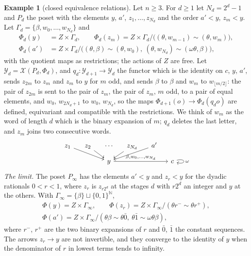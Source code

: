 \documentclass[11pt]{amsart}
\theoremstyle{definition}
\newtheorem{ex}[thm]{Example}
\newcommand{\cX}{\mathcal X}
\begin{document}
\begin{ex}[closed equivalence relations]\label{ex:interval}
Let $n\ge3$. For $d\ge1$ let $N_d=2^d-1$ and $P_d$ the poset with the
elements $y$, $a'$, $z_1,\dots,z_{N_d}$ and the order $a'<y$,
$z_m<y$. Let $\Gamma_d=\{\beta,w_0,\dots,w_{N_d}\}$ and
\begin{align*}
\Phi_d(y)&=Z\times\Gamma_d,\qquad
\Phi_d(z_m)=Z\times\Gamma_d/\bigl((\theta,w_{m-1})\sim(\theta,w_m)
\bigr),\\
\Phi_d(a')&=Z\times\Gamma_d/\bigl((\theta,\beta)\sim(\theta,w_0),\
(\theta,w_{N_d})\sim(\omega\theta,\beta)\bigr),
\end{align*}
with the quotient maps as restrictions; the actions of $Z$ are free.
Let $\mathcal Y_d=\cX(P_d,\Phi_d)$, and $q_d\colon\mathcal Y_{d+1}\to
\mathcal Y_d$ the functor which is the identity on $c$, $y$, $a'$,
sends $z_{2m}$ to $z_m$ and $z_m$ to $y$ for $m$ odd, and sends
$\beta$ to $\beta$ and $w_m$ to $w_{\lfloor m/2\rfloor}$: the pair of
$z_{2m}$ is sent to the pair of $z_m$, the pair of $z_m$, $m$ odd, to
a pair of equal elements, and $w_0$, $w_{2N_d+1}$ to $w_0$,
$w_{N_d}$, so the maps $\Phi_{d+1}(o)\to\Phi_d(q_do)$ are defined,
equivariant and compatible with the restrictions. We think of $w_m$
as the word of length $d$ which is the binary expansion of $m$; $q_d$
deletes the last letter, and $z_m$ joins two consecutive words.
\[
\begin{tikzcd}[column sep=small,row sep=small]
z_1\ar[drr]&z_2\ar[dr]&\cdots&z_{N_d}\ar[dl]&a'\ar[dll]&\\
&&y\ar[rrr,"{\beta,w_0,\dots,w_{N_d}}"]&&&c\ar[loop right,"\omega"]
\end{tikzcd}
\]
\emph{The limit.} The poset $P_\infty$ has the elements $a'<y$ and
$z_r<y$ for the dyadic rationals $0<r<1$, where $z_r$ is $z_{r2^d}$
at the stages $d$ with $r2^d$ an integer and $y$ at the others. With
$\Gamma_\infty=\{\beta\}\sqcup\{0,1\}^{\mathbb N}$,
\[
\begin{gathered}
\Phi(y)=Z\times\Gamma_\infty,\qquad\Phi(z_r)=Z\times\Gamma_\infty/
(\theta r^-\sim\theta r^+),\\
\Phi(a')=Z\times\Gamma_\infty/(\theta\beta\sim\theta\bar0,\
\theta\bar1\sim\omega\theta\beta),
\end{gathered}
\]
where $r^-$, $r^+$ are the two binary expansions of $r$ and $\bar0$,
$\bar1$ the constant sequences. The arrows $z_r\to y$ are not
invertible, and they converge to the identity of $y$ when the
denominator of $r$ in lowest terms tends to infinity.


\end{ex}
\end{document}
